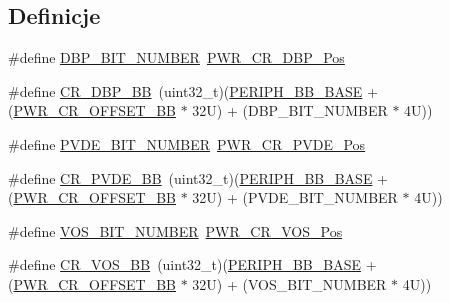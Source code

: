 \subsection*{Definicje}
\begin{DoxyCompactItemize}
\item 
\#define \hyperlink{group___p_w_r___c_r__register__alias_ga398aef263adbda7c1f1dc9020fde83f3}{D\+B\+P\+\_\+\+B\+I\+T\+\_\+\+N\+U\+M\+B\+ER}~\hyperlink{group___peripheral___registers___bits___definition_gaa3c90e817e3ccc0031b20014ef7d434e}{P\+W\+R\+\_\+\+C\+R\+\_\+\+D\+B\+P\+\_\+\+Pos}
\item 
\#define \hyperlink{group___p_w_r___c_r__register__alias_ga799ab60bdbcfc1076cf2d7f206d09b0c}{C\+R\+\_\+\+D\+B\+P\+\_\+\+BB}~(uint32\+\_\+t)(\hyperlink{group___peripheral__memory__map_gaed7efc100877000845c236ccdc9e144a}{P\+E\+R\+I\+P\+H\+\_\+\+B\+B\+\_\+\+B\+A\+SE} + (\hyperlink{group___p_w_r__register__alias__address_ga387e4e883d6bea5c2223adc42ee72daa}{P\+W\+R\+\_\+\+C\+R\+\_\+\+O\+F\+F\+S\+E\+T\+\_\+\+BB} $\ast$ 32\+U) + (\+D\+B\+P\+\_\+\+B\+I\+T\+\_\+\+N\+U\+M\+B\+E\+R $\ast$ 4\+U))
\item 
\#define \hyperlink{group___p_w_r___c_r__register__alias_gae731170c1675c5471fc06501228905b0}{P\+V\+D\+E\+\_\+\+B\+I\+T\+\_\+\+N\+U\+M\+B\+ER}~\hyperlink{group___peripheral___registers___bits___definition_gadb4073cd8adfdba51b106072bab82fc3}{P\+W\+R\+\_\+\+C\+R\+\_\+\+P\+V\+D\+E\+\_\+\+Pos}
\item 
\#define \hyperlink{group___p_w_r___c_r__register__alias_ga49f51ef8285a6be76fd204d49a00709c}{C\+R\+\_\+\+P\+V\+D\+E\+\_\+\+BB}~(uint32\+\_\+t)(\hyperlink{group___peripheral__memory__map_gaed7efc100877000845c236ccdc9e144a}{P\+E\+R\+I\+P\+H\+\_\+\+B\+B\+\_\+\+B\+A\+SE} + (\hyperlink{group___p_w_r__register__alias__address_ga387e4e883d6bea5c2223adc42ee72daa}{P\+W\+R\+\_\+\+C\+R\+\_\+\+O\+F\+F\+S\+E\+T\+\_\+\+BB} $\ast$ 32\+U) + (\+P\+V\+D\+E\+\_\+\+B\+I\+T\+\_\+\+N\+U\+M\+B\+E\+R $\ast$ 4\+U))
\item 
\#define \hyperlink{group___p_w_r___c_r__register__alias_ga9fe65342711a2c4614ef2eadee4a751c}{V\+O\+S\+\_\+\+B\+I\+T\+\_\+\+N\+U\+M\+B\+ER}~\hyperlink{group___peripheral___registers___bits___definition_ga2f4f27bd20dad692917746ce1f184d28}{P\+W\+R\+\_\+\+C\+R\+\_\+\+V\+O\+S\+\_\+\+Pos}
\item 
\#define \hyperlink{group___p_w_r___c_r__register__alias_ga98bf66513495732b9b3ee21f182e1591}{C\+R\+\_\+\+V\+O\+S\+\_\+\+BB}~(uint32\+\_\+t)(\hyperlink{group___peripheral__memory__map_gaed7efc100877000845c236ccdc9e144a}{P\+E\+R\+I\+P\+H\+\_\+\+B\+B\+\_\+\+B\+A\+SE} + (\hyperlink{group___p_w_r__register__alias__address_ga387e4e883d6bea5c2223adc42ee72daa}{P\+W\+R\+\_\+\+C\+R\+\_\+\+O\+F\+F\+S\+E\+T\+\_\+\+BB} $\ast$ 32\+U) + (\+V\+O\+S\+\_\+\+B\+I\+T\+\_\+\+N\+U\+M\+B\+E\+R $\ast$ 4\+U))
\end{DoxyCompactItemize}


